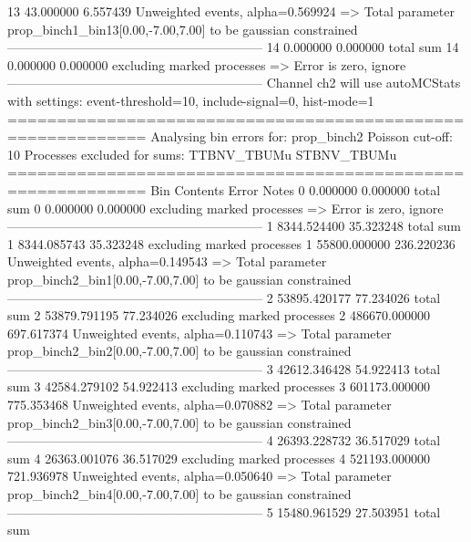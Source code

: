 13         43.000000       6.557439        Unweighted events, alpha=0.569924
  => Total parameter prop_binch1_bin13[0.00,-7.00,7.00] to be gaussian constrained
------------------------------------------------------------
14         0.000000        0.000000        total sum                     
14         0.000000        0.000000        excluding marked processes    
  => Error is zero, ignore      
------------------------------------------------------------
Channel ch2 will use autoMCStats with settings: event-threshold=10, include-signal=0, hist-mode=1
============================================================
Analysing bin errors for: prop_binch2
Poisson cut-off: 10
Processes excluded for sums: TTBNV_TBUMu STBNV_TBUMu
============================================================
Bin        Contents        Error           Notes                         
0          0.000000        0.000000        total sum                     
0          0.000000        0.000000        excluding marked processes    
  => Error is zero, ignore      
------------------------------------------------------------
1          8344.524400     35.323248       total sum                     
1          8344.085743     35.323248       excluding marked processes    
1          55800.000000    236.220236      Unweighted events, alpha=0.149543
  => Total parameter prop_binch2_bin1[0.00,-7.00,7.00] to be gaussian constrained
------------------------------------------------------------
2          53895.420177    77.234026       total sum                     
2          53879.791195    77.234026       excluding marked processes    
2          486670.000000   697.617374      Unweighted events, alpha=0.110743
  => Total parameter prop_binch2_bin2[0.00,-7.00,7.00] to be gaussian constrained
------------------------------------------------------------
3          42612.346428    54.922413       total sum                     
3          42584.279102    54.922413       excluding marked processes    
3          601173.000000   775.353468      Unweighted events, alpha=0.070882
  => Total parameter prop_binch2_bin3[0.00,-7.00,7.00] to be gaussian constrained
------------------------------------------------------------
4          26393.228732    36.517029       total sum                     
4          26363.001076    36.517029       excluding marked processes    
4          521193.000000   721.936978      Unweighted events, alpha=0.050640
  => Total parameter prop_binch2_bin4[0.00,-7.00,7.00] to be gaussian constrained
------------------------------------------------------------
5          15480.961529    27.503951       total sum                     
